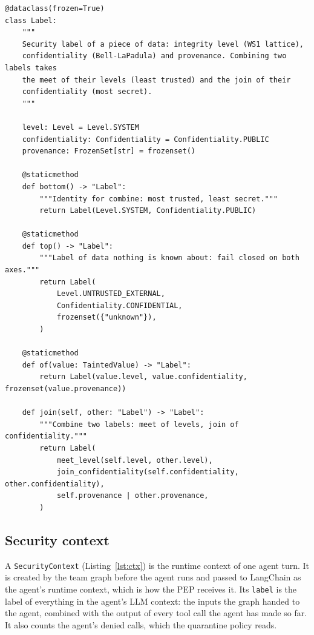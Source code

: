 \documentclass[11pt,a4paper]{article}
\DeclareRobustCommand{\code}[1]{{\renewcommand{\_}{\textunderscore\allowbreak}\texttt{#1}}}
\begin{document}
\begin{lstlisting}[firstnumber=15,style=py,caption={Security label (\texttt{security/labels.py}, lines 15--52)},label={lst:label}]
@dataclass(frozen=True)
class Label:
    """
    Security label of a piece of data: integrity level (WS1 lattice),
    confidentiality (Bell-LaPadula) and provenance. Combining two labels takes
    the meet of their levels (least trusted) and the join of their
    confidentiality (most secret).
    """

    level: Level = Level.SYSTEM
    confidentiality: Confidentiality = Confidentiality.PUBLIC
    provenance: FrozenSet[str] = frozenset()

    @staticmethod
    def bottom() -> "Label":
        """Identity for combine: most trusted, least secret."""
        return Label(Level.SYSTEM, Confidentiality.PUBLIC)

    @staticmethod
    def top() -> "Label":
        """Label of data nothing is known about: fail closed on both axes."""
        return Label(
            Level.UNTRUSTED_EXTERNAL,
            Confidentiality.CONFIDENTIAL,
            frozenset({"unknown"}),
        )

    @staticmethod
    def of(value: TaintedValue) -> "Label":
        return Label(value.level, value.confidentiality, frozenset(value.provenance))

    def join(self, other: "Label") -> "Label":
        """Combine two labels: meet of levels, join of confidentiality."""
        return Label(
            meet_level(self.level, other.level),
            join_confidentiality(self.confidentiality, other.confidentiality),
            self.provenance | other.provenance,
        )
\end{lstlisting}

\subsection{Security context}
\label{sec:context}

A \code{SecurityContext} (Listing~\ref{lst:ctx}) is the runtime context of one agent
turn. It is created by the team graph before the agent runs and passed to LangChain as
the agent's runtime context, which is how the PEP receives it. Its \code{label} is the
label of everything in the agent's LLM context: the inputs the graph handed to the agent,
combined with the output of every tool call the agent has made so far. It also counts the
agent's denied calls, which the quarantine policy reads.
\end{document}
